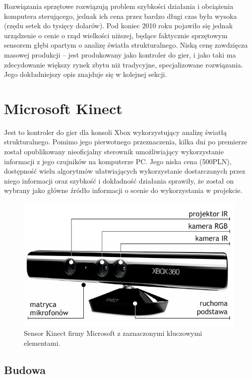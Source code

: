 Rozwiązania sprzętowe rozwiązują problem szybkości działania i obciążenia
komputera sterującego, jednak ich cena przez bardzo długi czas była wysoka
(rzędu setek do tysięcy dolarów). Pod koniec 2010 roku pojawiło się jednak urządzenie
o cenie o rząd wielkości niższej, będące faktycznie sprzętowym sensorem głębi
opartym o analizę światła strukturalnego. Niską cenę zawdzięcza masowej produkcji
-- jest produkowany jako kontroler do gier, i jako taki ma zdecydowanie większy
rynek zbytu niż tradycyjne, specjalizowane rozwiązania. Jego dokładniejszy opis
znajduje się w kolejnej sekcji.

\section{Microsoft Kinect}

Jest to kontroler do gier dla konsoli Xbox wykorzystujący analizę światłą strukturalnego.
Pomimo jego pierwotnego przeznaczenia, kilka dni po premierze został opublikowany
nieoficjalny sterownik umożliwiający wykorzystanie informacji z jego czujników na
komputerze PC. Jego niska cena (500PLN), dostępność wielu algorytmów ułatwiających
wykorzystanie dostarczanych przez niego informacji oraz szybkość i dokładność
działania sprawiły, że został on wybrany jako główne źródło informacji o scenie
do wykorzystania w projekcie.

\begin{figure}[h!]
\centering
\includegraphics{../img/kinect_hardware}
\caption[Sensor Kinect firmy Microsoft]{Sensor Kinect firmy Microsoft z zaznaczonymi
kluczowymi elementami.}
\label{fig:kinect_hardware}
\end{figure}

\subsection{Budowa}

